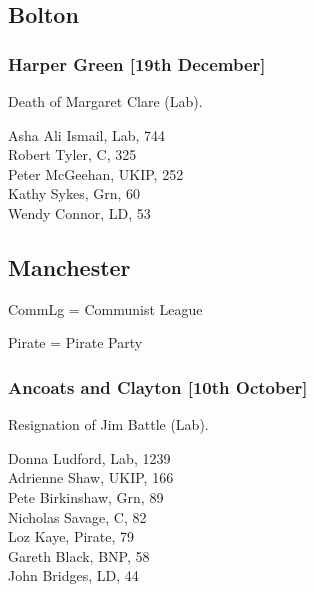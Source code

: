 \documentclass[a4paper,openany,10pt]{book}
\begin{document}
\subsection*{Bolton}

\subsubsection*{Harper Green \hspace*{\fill}\nolinebreak[1]%
\enspace\hspace*{\fill}
[19th December]}


Death of Margaret Clare (Lab).



Asha Ali Ismail, Lab, 744\\
Robert Tyler, C, 325\\
Peter McGeehan, UKIP, 252\\
Kathy Sykes, Grn, 60\\
Wendy Connor, LD, 53\\


\subsection*{Manchester}

CommLg = Communist League

Pirate = Pirate Party

\subsubsection*{Ancoats and Clayton \hspace*{\fill}\nolinebreak[1]%
\enspace\hspace*{\fill}
[10th October]}


Resignation of Jim Battle (Lab).



Donna Ludford, Lab, 1239\\
Adrienne Shaw, UKIP, 166\\
Pete Birkinshaw, Grn, 89\\
Nicholas Savage, C, 82\\
Loz Kaye, Pirate, 79\\
Gareth Black, BNP, 58\\
John Bridges, LD, 44\\
\end{document}
